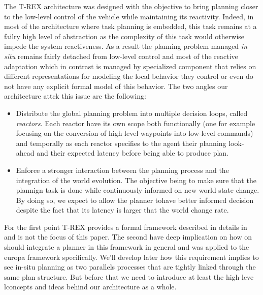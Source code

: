 The T-REX architecture was designed with the objective to bring 
planning closer to the low-level control of the vehicle while
maintaining its reactivity. Indeed, in most of the architecture where
task planning is embedded, this task remains at a failry high level of
abstraction as the complexity of this task would otherwise impede the
system reactiveness. As a result the planning problem managed {\em in
  situ} remains fairly detached from low-level control and most of the 
reactive adaptation which in contrast is managed by specialized 
component that relies on different representations for modeling 
the local behavior they control or even do not have any explicit 
formal model of this behavior. The two angles our architecture attck
this issue are the following:
\begin{itemize}
\item Distribute the global planning problem into multiple decision
  loops, called {\em reactors}. Each reactor have its own scope both 
  functionally (one for example focusing on the conversion of high 
  level waypoints into low-level commands) and temporally as 
  each reactor specifies to the agent their planning look-ahead and
  their expected latency before being able to produce plan.
\item Enforce a stronger interaction between the planning process 
  and the integration of the world evolution. The objective being to
  make sure that the plannign task is done while continuously informed 
  on new world state change. By doing so, we expect to allow the planner
  tohave better informed decision despite the fact that its latency is
  larger that the world change rate.
\end{itemize}

For the first point T-REX provides a formal framework described in
details in \cite{Py:2010ti} and is not the focus of this paper. The
second have deep implication on how on should integrate a planner in
this framework in general and was applied to the europa framework
specifically. We'll develop later how this requirement implies to see
in-situ planning as two parallels processes that are tightly linked
through the same plan structure. But before that we need to introduce
at least the high leve lconcepts and ideas behind our architecture as
a whole. 

